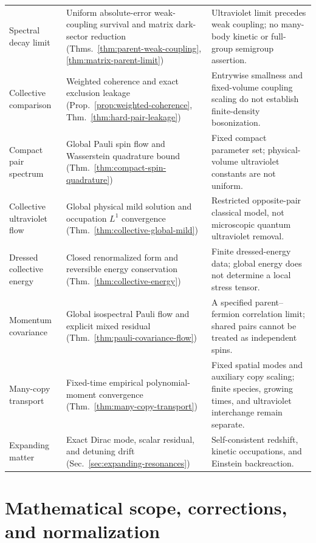 \documentclass[11pt,a4paper,oneside]{book}
\theoremstyle{plain}
\theoremstyle{definition}
\theoremstyle{remark}
\begin{document}
\begin{longtable}{@{}>{\raggedright\arraybackslash}p{}>{\raggedright\arraybackslash}p{}>{\raggedright\arraybackslash}p{}@{}}
Spectral decay limit & Uniform absolute-error weak-coupling survival and matrix dark-sector reduction (Thms.~\ref{thm:parent-weak-coupling}, \ref{thm:matrix-parent-limit}) & Ultraviolet limit precedes weak coupling; no many-body kinetic or full-group semigroup assertion.\\[1pt]
Collective comparison & Weighted coherence and exact exclusion leakage (Prop.~\ref{prop:weighted-coherence}, Thm.~\ref{thm:hard-pair-leakage}) & Entrywise smallness and fixed-volume coupling scaling do not establish finite-density bosonization.\\[1pt]
Compact pair spectrum & Global Pauli spin flow and Wasserstein quadrature bound (Thm.~\ref{thm:compact-spin-quadrature}) & Fixed compact parameter set; physical-volume ultraviolet constants are not uniform.\\[1pt]
Collective ultraviolet flow & Global physical mild solution and occupation $L^1$ convergence (Thm.~\ref{thm:collective-global-mild}) & Restricted opposite-pair classical model, not microscopic quantum ultraviolet removal.\\[1pt]
Dressed collective energy & Closed renormalized form and reversible energy conservation (Thm.~\ref{thm:collective-energy}) & Finite dressed-energy data; global energy does not determine a local stress tensor.\\[1pt]
Momentum covariance & Global isospectral Pauli flow and explicit mixed residual (Thm.~\ref{thm:pauli-covariance-flow}) & A specified parent--fermion correlation limit; shared pairs cannot be treated as independent spins.\\[1pt]
Many-copy transport & Fixed-time empirical polynomial-moment convergence (Thm.~\ref{thm:many-copy-transport}) & Fixed spatial modes and auxiliary copy scaling; finite species, growing times, and ultraviolet interchange remain separate.\\[1pt]
Expanding matter & Exact Dirac mode, scalar residual, and detuning drift (Sec.~\ref{sec:expanding-resonances}) & Self-consistent redshift, kinetic occupations, and Einstein backreaction.\\[1pt]
\end{longtable}
\normalsize


\chapter{Mathematical scope, corrections, and normalization}
\label{app:sources}
\end{document}
